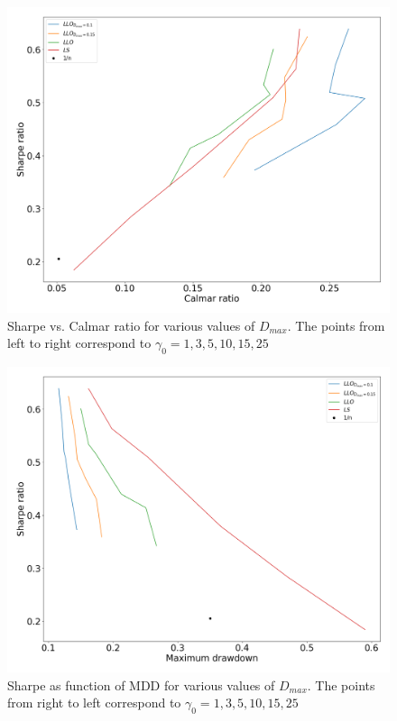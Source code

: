 \begin{figure}[H]
    \centering
    \includegraphics[width=1\textwidth]{analysis/portfolio_exercise/images/mle/sharpe_calmar_llo.png}
    \caption[Sharpe vs. Calmar ratio for various values of $D_{max}$]{Sharpe vs. Calmar ratio for various values of $D_{max}$. The points from left to right correspond to $\gamma_0=1,3,5,10,15,25$}
    \label{fig:MPC_sharpe_calmar_llo}
\end{figure}

\begin{figure}[H]
    \centering
    \includegraphics[width=1\textwidth]{analysis/portfolio_exercise/images/mle/sharpe_mdd_llo.png}
    \caption[Sharpe as function of MDD for various values of $D_{max}$]{Sharpe as function of MDD for various values of $D_{max}$. The points from right to left correspond to $\gamma_0=1,3,5,10,15,25$}
    \label{fig:MPC_sharpe_mdd_llo}
\end{figure}

